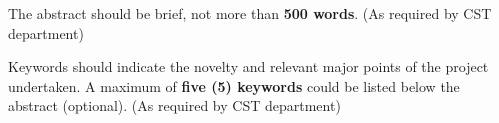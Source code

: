 \documentclass[12pt, a4paper]{report}
\begin{document}
	\begin{justify}
		{
			The abstract should be brief, not more than \textbf{500 words}. (As required by CST department)
			
			Keywords should indicate the novelty and relevant major points of the project undertaken. A maximum of \textbf{five (5) keywords} could be listed below the abstract (optional). (As required by CST department)
			
			
		}
	\end{justify}
	
	
	
	
	
	
	
	
	
	
	
	
	
	
	
	
	
	
	\newpage
	\tableofcontents

	
	
	
	
	
	
	
	
	
	
	
	
	
	\setcounter{chapter}{4}
\end{document}
